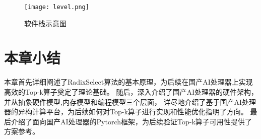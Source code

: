 \begin{figure}[ht]
    \centering
    \texttt{[image: level.png]}
    \caption{软件栈示意图}
    \label{fig:level}
    \note{}
  \end{figure}



\section{本章小结}
本章首先详细阐述了RadixSelect算法的基本原理，为后续在国产AI处理器上实现高效的Top-k算子奠定了理论基础。
随后，深入介绍了国产AI处理器的硬件架构，并从抽象硬件模型,内存模型和编程模型三个层面，
详尽地介绍了基于国产AI处理器的异构计算平台，为后续如何对Top-k算子进行实现和性能优化指明了方向。
最后介绍了面向国产AI处理器的Pytorch框架，为后续验证Top-k算子可用性提供了方案参考。